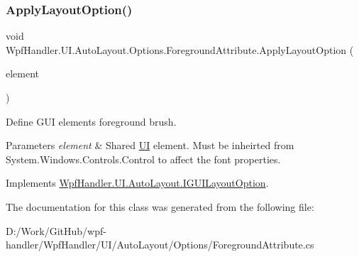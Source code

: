 \subsubsection{\texorpdfstring{Apply\+Layout\+Option()}{ApplyLayoutOption()}}
{\footnotesize\ttfamily void Wpf\+Handler.\+U\+I.\+Auto\+Layout.\+Options.\+Foreground\+Attribute.\+Apply\+Layout\+Option (\begin{DoxyParamCaption}\item[{Framework\+Element}]{element }\end{DoxyParamCaption})}



Define G\+UI element\textquotesingle{}s foreground brush. 


\begin{DoxyParams}{Parameters}
{\em element} & Shared \mbox{\hyperlink{namespace_wpf_handler_1_1_u_i}{UI}} element. Must be inheirted from {\ttfamily System.\+Windows.\+Controls.\+Control} to affect the font properties. \\
\hline
\end{DoxyParams}


Implements \mbox{\hyperlink{interface_wpf_handler_1_1_u_i_1_1_auto_layout_1_1_i_g_u_i_layout_option_ac2d2fa8aeaf753b3248381399f991005}{Wpf\+Handler.\+U\+I.\+Auto\+Layout.\+I\+G\+U\+I\+Layout\+Option}}.



The documentation for this class was generated from the following file\+:\begin{DoxyCompactItemize}
\item 
D\+:/\+Work/\+Git\+Hub/wpf-\/handler/\+Wpf\+Handler/\+U\+I/\+Auto\+Layout/\+Options/Foreground\+Attribute.\+cs\end{DoxyCompactItemize}

